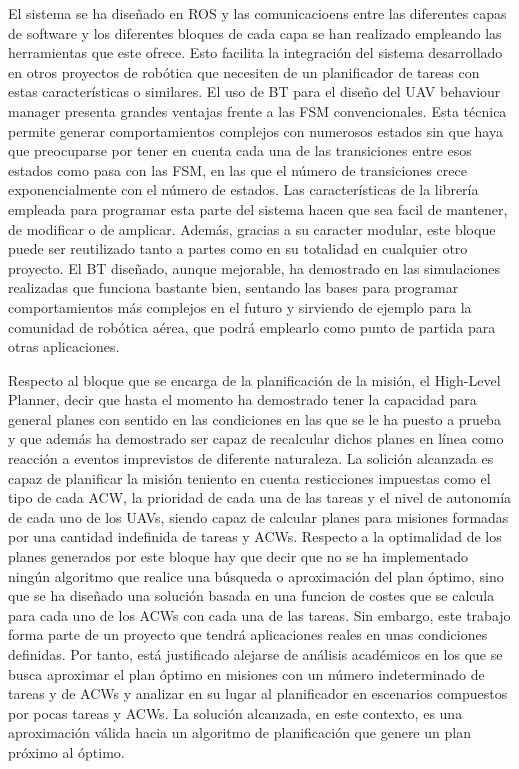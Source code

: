 \documentclass[fontsize=11pt, English=true, Myfinal=true, twoside, numbers=noenddot]{scrbook}
\begin{document}
El sistema se ha diseñado en ROS y las comunicacioens entre las diferentes capas de software y los diferentes bloques de cada capa se han realizado empleando las herramientas que este ofrece. Esto facilita la integración del sistema desarrollado en otros proyectos de robótica que necesiten de un planificador de tareas con estas características o similares. El uso de BT para el diseño del UAV behaviour manager presenta grandes ventajas frente a las FSM convencionales. Esta técnica permite generar comportamientos complejos con numerosos estados sin que haya que preocuparse por tener en cuenta cada una de las transiciones entre esos estados como pasa con las FSM, en las que el número de transiciones crece exponencialmente con el número de estados. Las características de la librería empleada para programar esta parte del sistema hacen que sea facil de mantener, de modificar o de amplicar. Además, gracias a su caracter modular, este bloque puede ser reutilizado tanto a partes como en su totalidad en cualquier otro proyecto. El BT diseñado, aunque mejorable, ha demostrado en las simulaciones realizadas que funciona bastante bien, sentando las bases para programar comportamientos más complejos en el futuro y sirviendo de ejemplo para la comunidad de robótica aérea, que podrá emplearlo como punto de partida para otras aplicaciones. 

Respecto al bloque que se encarga de la planificación de la misión, el High-Level Planner, decir que hasta el momento ha demostrado tener la capacidad para general planes con sentido en las condiciones en las que se le ha puesto a prueba y que además ha demostrado ser capaz de recalcular dichos planes en línea como reacción a eventos imprevistos de diferente naturaleza. La solición alcanzada es capaz de planificar la misión teniento en cuenta resticciones impuestas como el tipo de cada ACW, la prioridad de cada una de las tareas y el nivel de autonomía de cada uno de los UAVs, siendo capaz de calcular planes para misiones formadas por una cantidad indefinida de tareas y ACWs. Respecto a la optimalidad de los planes generados por este bloque hay que decir que no se ha implementado ningún algoritmo que realice una búsqueda o aproximación del plan óptimo, sino que se ha diseñado una solución basada en una funcion de costes que se calcula para cada uno de los ACWs con cada una de las tareas. Sin embargo, este trabajo forma parte de un proyecto que tendrá aplicaciones reales en unas condiciones definidas. Por tanto, está justificado alejarse de análisis académicos en los que se busca aproximar el plan óptimo en misiones con un número indeterminado de tareas y de ACWs y analizar en su lugar al planificador en escenarios compuestos por pocas tareas y ACWs. La solución alcanzada, en este contexto, es una aproximación válida hacia un algoritmo de planificación que genere un plan próximo al óptimo.
\end{document}
